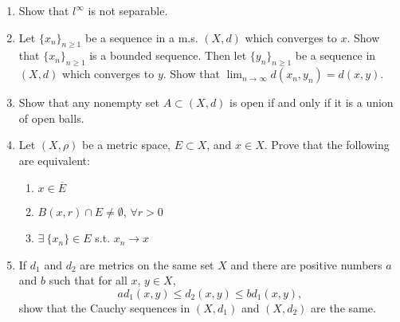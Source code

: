 \documentclass[12pt]{article}
\begin{document}
\begin{enumerate}
\item Show that $l^{\infty}$ is not separable.
\begin{mybox}

    \vspace*{15mm}
\end{mybox}
 
\item Let $\{x_n\}_{n \geq 1}$ be a sequence in a m.s.
    $(X, d)$ which converges to $x$. Show that
    $\{x_n\}_{n \geq 1}$ is a bounded sequence.
    Then let $\{y_n\}_{n \geq 1}$ be a sequence in
    $(X, d)$ which converges to $y$. Show that
    $\lim_{n \to \infty} d(x_n, y_n) = d(x,y)$. 
\begin{mybox}

    \vspace*{15mm}
\end{mybox}
 
\item Show that any nonempty set $A\subset (X, d)$
    is open if and only if it is a
    union of open balls.
\begin{mybox}

    \vspace*{15mm}
\end{mybox}


\item Let $(X, \rho)$ be a metric space, $E \subset X$, and $x \in X$. Prove that the following are equivalent:
\begin{enumerate}
\item $x \in \overline{E}$
\item $B(x,r) \cap E \neq \emptyset$, $\forall r > 0$
\item $\exists \ \{x_n\} \in E$ s.t. $x_n \to x$
\end{enumerate}  
\begin{mybox}

    \vspace*{15mm}
\end{mybox}

 
\item If $d_1$ and $d_2$ are metrics on the same set
    $X$ and there are positive
    numbers $a$ and $b$ such that for all $x$, $y\in X$,
    $$ad_1(x, y)\leq d_2(x,y)\leq bd_1(x,y),$$
    show that the Cauchy sequences in $(X,d_1)$
    and $(X,d_2)$ are the same.
\begin{mybox}

    \vspace*{15mm}
\end{mybox}
 

\end{enumerate}
\end{document}
